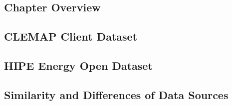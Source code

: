 \subsection{Chapter Overview}

\subsection{CLEMAP Client Dataset}

\subsection{HIPE Energy Open Dataset}

\subsection{Similarity and Differences of Data Sources}